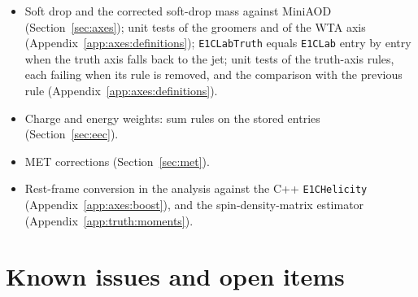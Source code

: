 \documentclass[11pt]{article}
\newcommand{\code}[1]{\texttt{#1}}
\begin{document}
\begin{itemize}
  of the wiring and of the required \code{vetoes} key; each fails when the corresponding part of the change is
  removed. An end-to-end check is reported in Section~\ref{sec:dilepton}.
\item Soft drop and the corrected soft-drop mass against MiniAOD (Section~\ref{sec:axes}); unit tests of the groomers and
  of the WTA axis (Appendix~\ref{app:axes:definitions}); \code{E1CLabTruth} equals \code{E1CLab} entry by entry when the
  truth axis falls back to the jet; unit tests of the truth-axis rules, each failing when its rule is removed, and the
  comparison with the previous rule (Appendix~\ref{app:axes:definitions}).
\item Charge and energy weights: sum rules on the stored entries (Section~\ref{sec:eec}).
\item MET corrections (Section~\ref{sec:met}).
\item Rest-frame conversion in the analysis against the C++ \code{E1CHelicity} (Appendix~\ref{app:axes:boost}), and the
  spin-density-matrix estimator (Appendix~\ref{app:truth:moments}).
\end{itemize}

\section{Known issues and open items}
\label{sec:issues}
\end{document}
